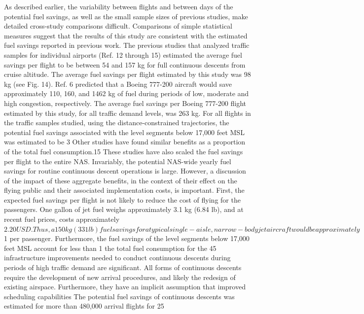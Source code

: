 \documentclass{aer1315-pretty}
\begin{document}
\begin{itemize}
     As described earlier, the variability between flights and between days of the potential fuel savings, as well as the
small sample sizes of previous studies, make detailed cross-study comparisons difficult. Comparisons of simple
statistical measures suggest that the results of this study are consistent with the estimated fuel savings reported in
previous work. The previous studies that analyzed traffic samples for individual airports (Ref. 12 through 15)
estimated the average fuel savings per flight to be between 54 and 157 kg for full continuous descents from cruise
altitude. The average fuel savings per flight estimated by this study was 98 kg (see Fig. 14). Ref. 6 predicted that a
Boeing 777-200 aircraft would save approximately 110, 160, and 1462 kg of fuel during periods of low, moderate
and high congestion, respectively. The average fuel savings per Boeing 777-200 flight estimated by this study, for
all traffic demand levels, was 263 kg.
     For all flights in the traffic samples studied, using the distance-constrained trajectories, the potential fuel savings
associated with the level segments below 17,000 feet MSL was estimated to be 3%
Other studies have found similar benefits as a proportion of the total fuel consumption.15 These studies have also
scaled the fuel savings per flight to the entire NAS. Invariably, the potential NAS-wide yearly fuel savings for
routine continuous descent operations is large. However, a discussion of the impact of these aggregate benefits, in
the context of their effect on the flying public and their associated implementation costs, is important.
     First, the expected fuel savings per flight is not likely to reduce the cost of flying for the passengers. One gallon
of jet fuel weighs approximately 3.1 kg (6.84 lb), and at recent fuel prices, costs approximately $2.20 USD. Thus, a
150 kg (331 lb) fuel savings for a typical single-aisle, narrow-body jet aircraft would be approximately $1 per
passenger. Furthermore, the fuel savings of the level segments below 17,000 feet MSL account for less than 1%
the total fuel consumption for the 45%
infrastructure improvements needed to conduct continuous descents during periods of high traffic demand are
significant. All forms of continuous descents require the development of new arrival procedures, and likely the
redesign of existing airspace. Furthermore, they have an implicit assumption that improved scheduling capabilities
    The potential fuel savings of continuous descents was estimated for more than 480,000 arrival flights for 25

\end{itemize}
\end{document}
